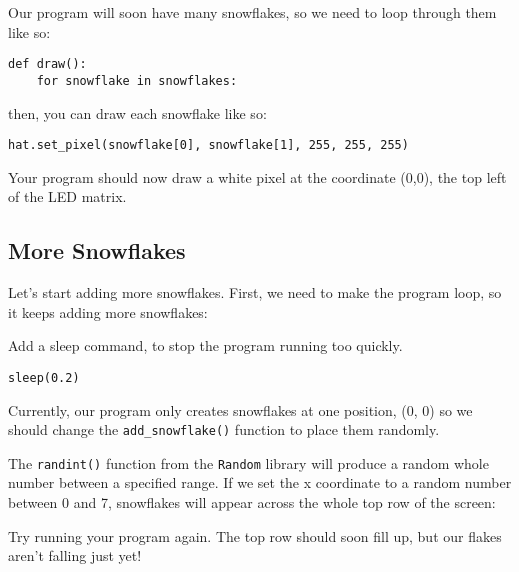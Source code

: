 Our program will soon have many snowflakes, so we need to loop through them like so:

\begin{lstlisting}[style=Python, title=draw()]
def draw():
	for snowflake in snowflakes:
\end{lstlisting}

then, you can draw each snowflake like so:

\begin{lstlisting}[style=Python, breaklines=true, firstnumber=3]
		hat.set_pixel(snowflake[0], snowflake[1], 255, 255, 255)	
\end{lstlisting}

Your program should now draw a white pixel at the coordinate (0,0), the top left of the LED matrix.

\subsection*{More Snowflakes}

Let's start adding more snowflakes. First, we need to make the program loop, so it keeps adding more snowflakes:



Add a sleep command, to stop the program running too quickly.

\begin{lstlisting}[style=Python, breaklines=true, firstnumber=5]
		sleep(0.2)	
\end{lstlisting}

Currently, our program only creates snowflakes at one position, (0, 0) so we should change the \texttt{add\_snowflake()} function to place them randomly.

The \texttt{randint()} function from the \texttt{Random} library will produce a random whole number between a specified range. If we set the x coordinate to a random number between 0 and 7, snowflakes will appear across the whole top row of the screen:



Try running your program again. The top row should soon fill up, but our flakes aren't falling just yet!
